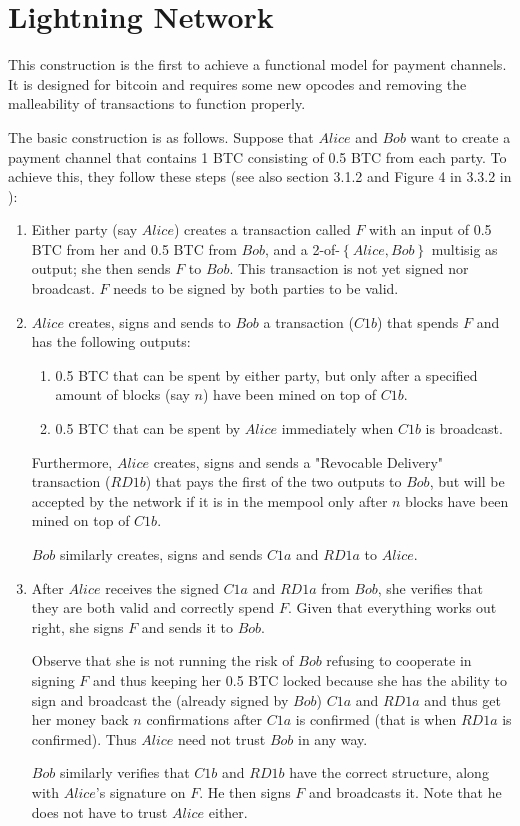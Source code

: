 \section{Lightning Network}
  This construction is the first to achieve a functional model for payment channels. It
  is designed for bitcoin and requires some new opcodes and removing the malleability of
  transactions to function properly.

  The basic construction is as follows. Suppose that $Alice$ and $Bob$ want to create a
  payment channel that contains 1 BTC consisting of 0.5 BTC from each party. To achieve
  this, they follow these steps (see also section 3.1.2 and Figure 4 in 3.3.2 in
  \cite{lightning}):
  \begin{enumerate}
    \item Either party (say $Alice$) creates a transaction called $F$ with an input of 0.5
    BTC from her and 0.5 BTC from $Bob$, and a 2-of-$\left\{Alice, Bob\right\}$ multisig
    as output; she then sends $F$ to $Bob$. This transaction is not yet signed nor
    broadcast. $F$ needs to be signed by both parties to be valid.

    \item $Alice$ creates, signs and sends to $Bob$ a transaction ($C1b$) that spends $F$
    and has the following outputs:
    \begin{enumerate}
      \item 0.5 BTC that can be spent by either party, but only after a specified amount
      of blocks (say $n$) have been mined on top of $C1b$.
      \item 0.5 BTC that can be spent by $Alice$ immediately when $C1b$ is broadcast.
    \end{enumerate}
    Furthermore, $Alice$ creates, signs and sends a "Revocable Delivery" transaction
    ($RD1b$) that pays the first of the two outputs to $Bob$, but will be accepted by the
    network if it is in the mempool only after $n$ blocks have been mined on top of $C1b$.

    $Bob$ similarly creates, signs and sends $C1a$ and $RD1a$ to $Alice$.

    \item After $Alice$ receives the signed $C1a$ and $RD1a$ from $Bob$, she verifies that
    they are both valid and correctly spend $F$. Given that everything works out right,
    she signs $F$ and sends it to $Bob$.

    Observe that she is not running the risk of $Bob$ refusing to cooperate in signing $F$
    and thus keeping her 0.5 BTC locked because she has the ability to sign and broadcast
    the (already signed by $Bob$) $C1a$ and $RD1a$ and thus get her money back $n$
    confirmations after $C1a$ is confirmed (that is when $RD1a$ is confirmed). Thus
    $Alice$ need not trust $Bob$ in any way.

    $Bob$ similarly verifies that $C1b$ and $RD1b$ have the correct structure, along with
    $Alice$'s signature on $F$. He then signs $F$ and broadcasts it. Note that he does not
    have to trust $Alice$ either.
  \end{enumerate}
